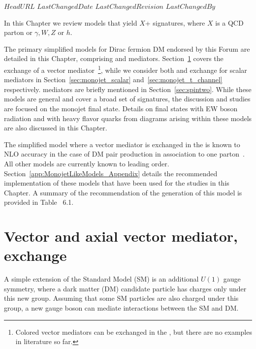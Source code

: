 \svnidlong
{$HeadURL$}
{$LastChangedDate$}
{$LastChangedRevision$}
{$LastChangedBy$}



In this Chapter we review 
models that yield $X$+\MET{} signatures,
where $X$ is a QCD parton or $\gamma, W, Z$ or $h$.

The primary simplified models  for Dirac fermion DM endorsed by this Forum are detailed in this Chapter, 
comprising \spinzero and \spinone mediators. Section~\ref{sec:monojet_V} covers the
\schannel exchange of a vector mediator~\footnote{Colored vector mediators 
can be exchanged in the \tchannel, but there are no examples in literature so far.}, 
while we consider both \schannel and \tchannel exchange for scalar mediators in
Section~\ref{sec:monojet_scalar} and~\ref{sec:monojet_t_channel} respectively. 
\Spintwo mediators are briefly mentioned in Section~\ref{sec:spintwo}.
While these models are general and cover a broad set of signatures,
the discussion and studies are focused on the monojet final state. 
Details on final states with EW boson radiation and with heavy flavor quarks 
from diagrams arising within these models are also discussed in this Chapter.

The simplified model where a vector mediator is exchanged in the \schannel 
is known to NLO accuracy in the case of DM pair production in association to one parton~\cite{Haisch:2013ata}. 
All other models are currently known to leading order. Section~\ref{app:MonojetLikeModels_Appendix}
details the recommended implementation of these models that
have been used for the studies in this Chapter. A summary of the recommendation of the generation of this model
is provided in Table~%
6.1.


\section{Vector and axial vector mediator, \schannel exchange}
\label{sec:monojet_V}

A simple extension of the Standard Model (SM) is an
additional $U(1)$ gauge symmetry, where a dark matter (DM)
candidate particle has charges only under this new group.
Assuming that some SM particles are also charged under
this group, a new gauge boson can mediate interactions
between the SM and DM.   

